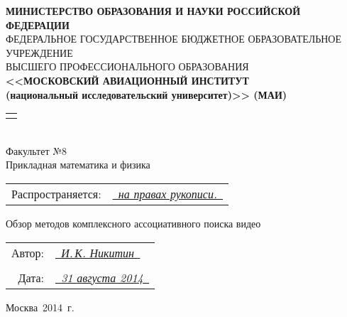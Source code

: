 
\begin{titlepage}

\newcommand{\byhand}[1]{\underline{\it \color{blue} \ #1\ }}

{\small\begin{center}
		{\bfseries
			МИНИСТЕРСТВО ОБРАЗОВАНИЯ И НАУКИ РОССИЙСКОЙ ФЕДЕРАЦИИ
		} \\
		{ \footnotesize
			ФЕДЕРАЛЬНОЕ ГОСУДАРСТВЕННОЕ БЮДЖЕТНОЕ ОБРАЗОВАТЕЛЬНОЕ УЧРЕЖДЕНИЕ \\
					ВЫСШЕГО ПРОФЕССИОНАЛЬНОГО ОБРАЗОВАНИЯ \\
		}
		{\bfseries
			<<МОСКОВСКИЙ АВИАЦИОННЫЙ ИНСТИТУТ \\	
			(национальный исследовательский университет)>> (МАИ)\\
		}
		\begin{tabular}{p{13cm}}
			\hline \\
		\end{tabular}\\
		{Факультет №8\\
			{ \footnotesize  Прикладная математика и физика }
		}
\end{center}}

\vspace{24pt}

{ \small \begin{flushright}
		\begin{tabular}{rl}
			Распространяется: & \byhand{на правах рукописи.} \\
		\end{tabular}
\end{flushright}}

\vspace{24pt}
	
\begin{center}
	\sffamily
	{ \Large
		\begin{onehalfspacing}
			Обзор методов комплексного ассоциативного поиска видео
		\end{onehalfspacing}
	}
\end{center}

\vspace{120pt}

{ \small \begin{flushright}
		\begin{tabular}{rl}
			Автор: 				& \byhand{И.\,К. Никитин}	\\
								&	\\
			Дата:				& \byhand{31 августа 2014} 	\\
		\end{tabular}
\end{flushright}}

\vfill

{ \small \begin{center} %
		Москва~2014~г.
\end{center}}
	
\end{titlepage}
